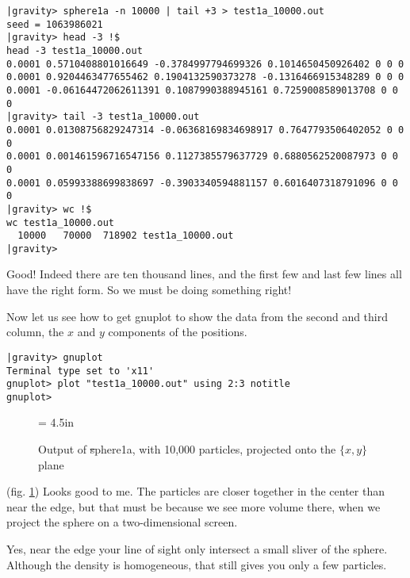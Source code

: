 \begin{small}
\begin{verbatim}
|gravity> sphere1a -n 10000 | tail +3 > test1a_10000.out
seed = 1063986021
|gravity> head -3 !$
head -3 test1a_10000.out
0.0001 0.5710408801016649 -0.3784997794699326 0.1014650450926402 0 0 0
0.0001 0.9204463477655462 0.1904132590373278 -0.1316466915348289 0 0 0
0.0001 -0.06164472062611391 0.1087990388945161 0.7259008589013708 0 0 0
|gravity> tail -3 test1a_10000.out
0.0001 0.01308756829247314 -0.06368169834698917 0.7647793506402052 0 0 0
0.0001 0.001461596716547156 0.1127385579637729 0.6880562520087973 0 0 0
0.0001 0.05993388699838697 -0.3903340594881157 0.6016407318791096 0 0 0
|gravity> wc !$
wc test1a_10000.out
  10000   70000  718902 test1a_10000.out
|gravity>
\end{verbatim}
\end{small}

\abc

\bob
Good!  Indeed there are ten thousand lines, and the first few and last
few lines all have the right form.  So we must be doing something right!

\alice
Now let us see how to get gnuplot to show the data from the second and
third column, the $x$ and $y$ components of the positions.

\cba

\begin{small}
\begin{verbatim}
|gravity> gnuplot
Terminal type set to 'x11'
gnuplot> plot "test1a_10000.out" using 2:3 notitle
gnuplot>
\end{verbatim}
\end{small}

\begin{figure}[htb]
\begin{center}
\epsfxsize = 4.5in
\caption[xy plot of {\st sphere1a} output]
{Output of {\st sphere1a}, with 10,000 particles, projected onto the
$\{x,y\}$ plane}
\label{fig:sphere1axy10000}
\end{center}
\end{figure}

\abc

\carol
(fig. \ref{fig:sphere1axy10000}) Looks good to me.  The particles are
closer together in the center than near the edge, but that must be
because we see more volume there, when we project the sphere on a
two-dimensional screen.

\alice
Yes, near the edge your line of sight only intersect a small sliver of
the sphere.  Although the density is homogeneous, that still gives you
only a few particles.

